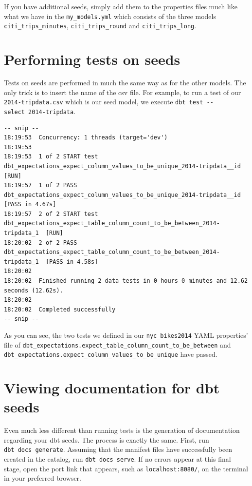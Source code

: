 \documentclass[
]{book}
\begin{document}
If you have additional seeds, simply add them to the properties files much like what we have in the \texttt{my\_models.yml} which consists of the three models \texttt{citi\_trips\_minutes}, \texttt{citi\_trips\_round} and \texttt{citi\_trips\_long}.

\hypertarget{performing-tests-on-seeds}{%
\section{Performing tests on seeds}\label{performing-tests-on-seeds}}

Tests on seeds are performed in much the same way as for the other models. The only trick is to insert the name of the csv file. For example, to run a test of our \texttt{2014-tripdata.csv} which is our seed model, we execute \texttt{dbt\ test\ -\/-select\ 2014-tripdata}.

\begin{verbatim}
-- snip --
18:19:53  Concurrency: 1 threads (target='dev')
18:19:53  
18:19:53  1 of 2 START test dbt_expectations_expect_column_values_to_be_unique_2014-tripdata__id  [RUN]
18:19:57  1 of 2 PASS dbt_expectations_expect_column_values_to_be_unique_2014-tripdata__id  [PASS in 4.67s]
18:19:57  2 of 2 START test dbt_expectations_expect_table_column_count_to_be_between_2014-tripdata_1  [RUN]
18:20:02  2 of 2 PASS dbt_expectations_expect_table_column_count_to_be_between_2014-tripdata_1  [PASS in 4.58s]
18:20:02  
18:20:02  Finished running 2 data tests in 0 hours 0 minutes and 12.62 seconds (12.62s).
18:20:02  
18:20:02  Completed successfully
-- snip --
\end{verbatim}

As you can see, the two tests we defined in our \texttt{nyc\_bikes2014} YAML properties' file of \texttt{dbt\_expectations.expect\_table\_column\_count\_to\_be\_between} and \texttt{dbt\_expectations.expect\_column\_values\_to\_be\_unique} have passed.

\hypertarget{viewing-documentation-for-dbt-seeds}{%
\section{Viewing documentation for dbt seeds}\label{viewing-documentation-for-dbt-seeds}}

Even much less different than running tests is the generation of documentation regarding your dbt seeds. The process is exactly the same. First, run \texttt{dbt\ docs\ generate}. Assuming that the manifest files have successfully been created in the catalog, run \texttt{dbt\ docs\ serve}. If no errors appear at this final stage, open the port link that appears, such as \texttt{localhost:8080/}, on the terminal in your preferred browser.
\end{document}
